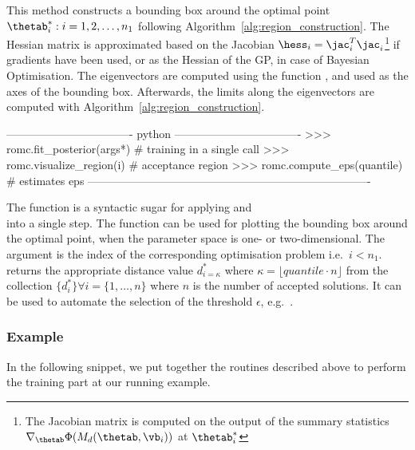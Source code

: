 \noindent
This method constructs a bounding box around the optimal point
$\thetab_i^* : i = 1, 2, \ldots, n_1$ following
Algorithm~\ref{alg:region_construction}. The Hessian matrix is
approximated based on the Jacobian
$\hess_i = \jac_i^T \jac_i$\footnote{The Jacobian matrix is computed
  on the output of the summary statistics
  $\nabla_{\thetab} \Phi(M_d(\thetab, \vb_i))$ at $\thetab_i^*$} if
gradients have been used, or as the Hessian of the GP, in case of
Bayesian Optimisation. The eigenvectors are computed using the function
, and used as the axes of the
bounding box. Afterwards, the limits along the
eigenvectors are computed with
Algorithm~\ref{alg:region_construction}.

\begin{Code}
---------------------------------- python ----------------------------------
>>> romc.fit_posterior(args*)  # training in a single call
>>> romc.visualize_region(i)   # acceptance region
>>> romc.compute_eps(quantile) # estimates eps
----------------------------------------------------------------------------
\end{Code}

\noindent
The function  is a syntactic sugar for applying
 and \\  into a single
step. The function  can be used for plotting
the bounding box around the optimal point, when the parameter space is
one- or two-dimensional. The argument  is the index of the corresponding
optimisation problem i.e.\ $i<n_1$.  returns the
appropriate distance value $d_{i=\kappa}^*$ where
$\kappa = \lfloor quantile \cdot n \rfloor$ from the collection
$\{ d_i^* \} \forall i = \{1, \ldots, n\}$ where $n$ is the number of
accepted solutions. It can be used to automate the selection of the
threshold $\epsilon$, e.g.\ .


\subsubsection*{Example}


In the following snippet, we put together the routines described above
to perform the training part at our running example.


